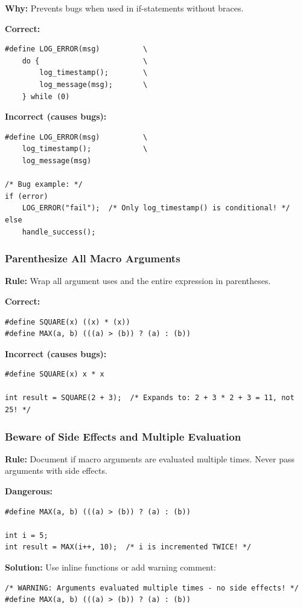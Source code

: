 \textbf{Why:} Prevents bugs when used in if-statements without braces.

\textbf{Correct:}
\begin{verbatim}
#define LOG_ERROR(msg)          \
    do {                        \
        log_timestamp();        \
        log_message(msg);       \
    } while (0)
\end{verbatim}

\textbf{Incorrect (causes bugs):}
\begin{verbatim}
#define LOG_ERROR(msg)          \
    log_timestamp();            \
    log_message(msg)

/* Bug example: */
if (error)
    LOG_ERROR("fail");  /* Only log_timestamp() is conditional! */
else
    handle_success();
\end{verbatim}

\subsubsection{Parenthesize All Macro Arguments}

\textbf{Rule:} Wrap all argument uses and the entire expression in parentheses.

\textbf{Correct:}
\begin{verbatim}
#define SQUARE(x) ((x) * (x))
#define MAX(a, b) (((a) > (b)) ? (a) : (b))
\end{verbatim}

\textbf{Incorrect (causes bugs):}
\begin{verbatim}
#define SQUARE(x) x * x

int result = SQUARE(2 + 3);  /* Expands to: 2 + 3 * 2 + 3 = 11, not 25! */
\end{verbatim}

\subsubsection{Beware of Side Effects and Multiple Evaluation}

\textbf{Rule:} Document if macro arguments are evaluated multiple times. Never pass arguments with side effects.

\textbf{Dangerous:}
\begin{verbatim}
#define MAX(a, b) (((a) > (b)) ? (a) : (b))

int i = 5;
int result = MAX(i++, 10);  /* i is incremented TWICE! */
\end{verbatim}

\textbf{Solution:} Use inline functions or add warning comment:
\begin{verbatim}
/* WARNING: Arguments evaluated multiple times - no side effects! */
#define MAX(a, b) (((a) > (b)) ? (a) : (b))
\end{verbatim}

